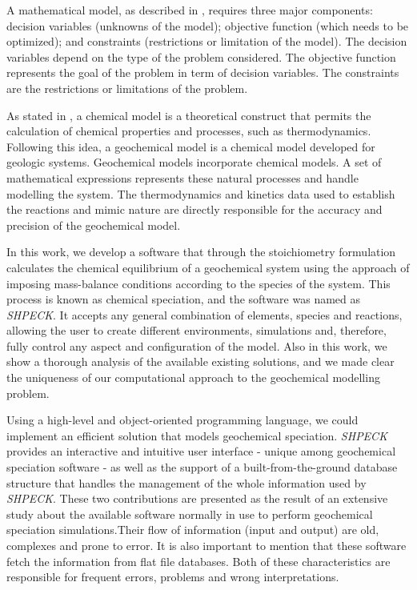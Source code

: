 \documentclass[ppgc,mestrado,English]{iiufrgs}
\begin{document}

A mathematical model, as described in \cite{Sarker:08}, requires three major components: decision variables (unknowns of the model); objective function (which needs to be optimized); and constraints (restrictions or limitation of the model). The decision variables depend on the type of the problem considered.  The objective function represents the goal of the problem in term of decision variables. The constraints are the restrictions or limitations of the problem.

As stated in \cite{Drever:05}, a chemical model is a theoretical construct that permits the calculation of chemical properties and processes, such as thermodynamics. Following this idea, a geochemical model is a chemical model developed for geologic systems. Geochemical models incorporate chemical models. A set of mathematical expressions represents these natural processes and handle modelling the system. The thermodynamics and kinetics data used to establish the reactions and mimic nature are directly responsible for the accuracy and precision of the geochemical model.



In this work, we develop a software that through the stoichiometry formulation calculates the chemical equilibrium of a geochemical system using the approach of imposing mass-balance conditions according to the species of the system. This process is known as chemical speciation, and the software was named as \emph{SHPECK}. It accepts any general combination of elements, species and reactions, allowing the user to create different environments, simulations and, therefore, fully control any aspect and configuration of the model. Also in this work, we show a thorough analysis of the available existing solutions, and we made clear the uniqueness of our computational approach to the geochemical modelling problem. 

Using a high-level and object-oriented programming language, we could implement an efficient solution that models geochemical speciation. \emph{SHPECK} provides an interactive and intuitive user interface - unique among geochemical speciation software - as well as the support of a built-from-the-ground database structure that handles the management of the whole information used by \emph{SHPECK}. These two contributions are presented as the result of an extensive study about the available software normally in use to perform geochemical speciation simulations.Their flow of information (input and output) are old, complexes and prone to error. It is also important to mention that these software fetch the information from flat file databases. Both of these characteristics are responsible for frequent errors, problems and wrong interpretations.
\end{document}
